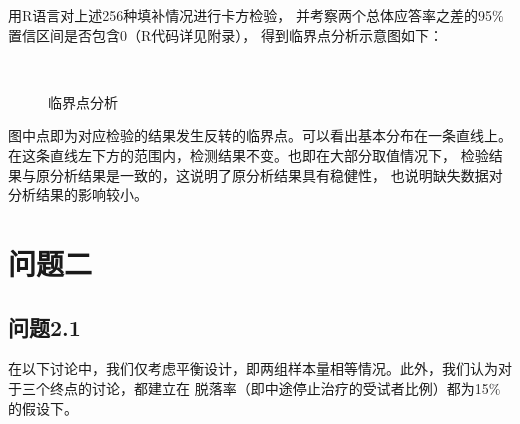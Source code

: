 \documentclass{article}
\begin{document}
用R语言对上述256种填补情况进行卡方检验，
并考察两个总体应答率之差的95$\%$置信区间是否包含0（R代码详见附录），
得到临界点分析示意图如下：
\begin{figure}[H]
    \centering
    \,    %
    \caption{临界点分析}
\end{figure}
图中点即为对应检验的结果发生反转的临界点。可以看出基本分布在一条直线上。
在这条直线左下方的范围内，检测结果不变。也即在大部分取值情况下，
检验结果与原分析结果是一致的，这说明了原分析结果具有稳健性，
也说明缺失数据对分析结果的影响较小。

\section{问题二}
\subsection{问题2.1}
在以下讨论中，我们仅考虑平衡设计，即两组样本量相等情况。此外，我们认为对于三个终点的讨论，都建立在
脱落率（即中途停止治疗的受试者比例）都为15$\%$的假设下。
\end{document}
